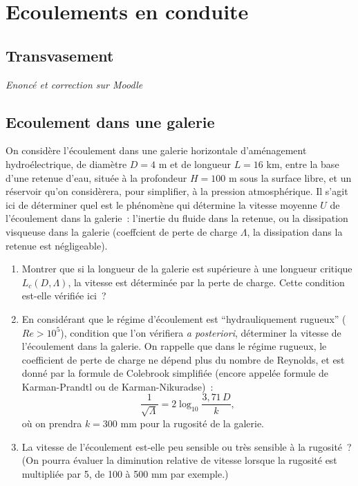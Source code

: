 
\section{Ecoulements en conduite}

\setcounter{subsection}{-1}



\subsection{Transvasement}

{\em Enoncé et correction sur Moodle } 


\subsection{Ecoulement dans une galerie}

On consid\`ere l'\'ecoulement dans une galerie horizontale d'am\'enagement hydro\'electrique, de diam\`etre $D = 4$ m et de longueur $L = 16$ km, entre la base d'une retenue d'eau, situ\'ee \`a la profondeur $H = 100$ m sous la surface libre, et un r\'eservoir qu'on consid\`erera, pour simplifier, \`a la pression atmosph\'erique. Il s'agit ici de d\'eterminer quel est le ph\'enom\`ene qui d\'etermine la vitesse moyenne $U$ de l'\'ecoulement dans la galerie~: l'inertie du fluide dans la retenue, ou la dissipation visqueuse dans la galerie (coeffcient de perte de charge $\Lambda$, la dissipation dans la retenue est n\'egligeable).

\begin{enumerate}
\item Montrer que si la longueur de la galerie est sup\'erieure \`a une longueur critique $L_c(D, \Lambda)$, la vitesse est d\'etermin\'ee par la perte de charge. Cette condition est-elle v\'erifi\'ee ici~? 
\item En consid\'erant que le r\'egime d'\'ecoulement est ``hydrauliquement rugueux'' ($Re > 10^5$), condition que l'on v\'erifiera {\it a posteriori}, d\'eterminer la vitesse de l'\'ecoulement dans la galerie. On rappelle que dans le r\'egime rugueux, le coefficient de perte de charge ne d\'epend plus du nombre de Reynolds, et est donn\'e par la formule de Colebrook simplifi\'ee (encore appel\'ee formule de Karman-Prandtl ou de Karman-Nikuradse)~:
$$
\frac{1}{\sqrt{\Lambda}} = 2 \log_{10} \frac{3,71 \, D}{k},
$$
o\`u on prendra $k = 300$ mm pour la rugosit\'e de la galerie. 
\item La vitesse de l'\'ecoulement est-elle peu sensible ou tr\`es sensible \`a la rugosit\'e~? (On pourra \'evaluer la diminution relative de vitesse lorsque la rugosit\'e est multipli\'ee par 5, de 100 \`a 500 mm par exemple.)
\end{enumerate}

